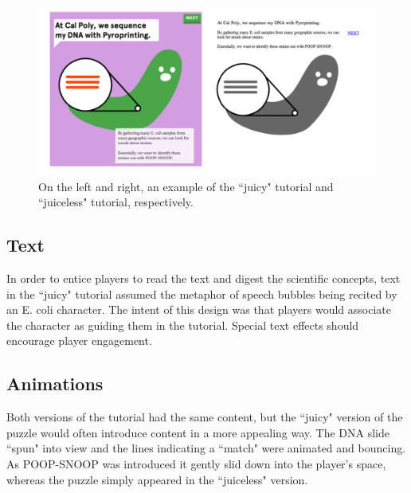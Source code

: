 \begin{figure}
\begin{center}
\includegraphics[width=150mm]{images/tutorial.pdf}
\caption[Differences between tutorials in each prototype]{On the left and right, an example of the ``juicy" tutorial and ``juiceless" tutorial, respectively.}
\label{fig:tutorial}
\end{center}
\end{figure}

\subsection{Text}

In order to entice players to read the text and digest the scientific concepts, text in the ``juicy" tutorial assumed the metaphor of speech bubbles being recited by an E. coli character. The intent of this design was that players would associate the character as guiding them in the tutorial. Special text effects should encourage player engagement. 

\subsection{Animations}

Both versions of the tutorial had the same content, but the ``juicy" version of the puzzle would often introduce content in a more appealing way. The DNA slide ``spun" into view and the lines indicating a ``match" were animated and bouncing. As POOP-SNOOP was introduced it gently slid down into the player's space, whereas the puzzle simply appeared in the ``juiceless" version.
